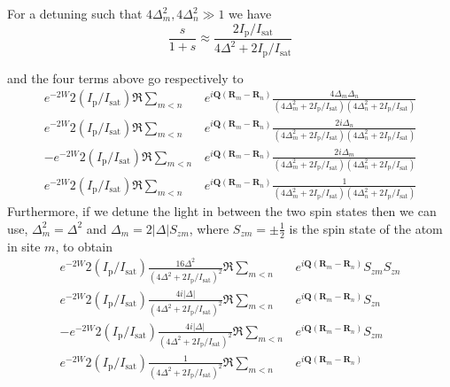 \documentclass[11pt,letter]{article}
\newcommand{\bv}[1]{\ensuremath{\bm{#1}}}
\newcommand{\iisat}{\ensuremath{I_{\mathrm{p}}/I_{\mathrm{sat}}}}
\begin{document}
For a detuning such that $4\Delta_{m}^{2}, 4\Delta_{n}^{2} \gg 1 $ we have
\begin{equation}
  \frac{s}{1+s} \approx \frac{2 \iisat }
                             { 4 \Delta^{2} + 2 \iisat }
\end{equation}

and the four terms above go respectively to  
\begin{align} 
     e^{-2W} 2(\iisat)\Re \sum_{m<n} & 
      e^{ i \bv{Q}( \bv{R}_{m} - \bv{R}_{n} ) } 
      \frac{ 4 \Delta_{m} \Delta_{n} } 
           {(4 \Delta_{m}^{2} + 2 \iisat)(4 \Delta_{n}^{2} + 2 \iisat)
 }  \\
     e^{-2W} 2(\iisat)\Re \sum_{m<n} & 
      e^{ i \bv{Q}( \bv{R}_{m} - \bv{R}_{n} ) } 
      \frac{ 2 i \Delta_{n} } 
           {(4 \Delta_{m}^{2} + 2 \iisat)(4 \Delta_{n}^{2} + 2 \iisat)
 }   \\
    -e^{-2W} 2(\iisat) \Re \sum_{m<n} & 
      e^{ i \bv{Q}( \bv{R}_{m} - \bv{R}_{n} ) } 
      \frac{ 2 i \Delta_{m} } 
           {(4 \Delta_{m}^{2} + 2 \iisat)(4 \Delta_{n}^{2} + 2 \iisat)
 }   \\
     e^{-2W} 2(\iisat)\Re \sum_{m<n} & 
      e^{ i \bv{Q}( \bv{R}_{m} - \bv{R}_{n} ) } 
      \frac{ 1} { (4 \Delta_{m}^{2} + 2 \iisat)(4 \Delta_{n}^{2} + 2 \iisat)
}   
\end{align}
Furthermore, if we detune the light in between the two spin states then we can
use, $\Delta_{m}^{2} = \Delta^{2}$ and  $\Delta_{m} = 2|\Delta|S_{zm}$, where
$S_{zm}=\pm\frac{1}{2}$ is the spin state of the atom in site $m$, to obtain
\begin{align} 
     e^{-2W} 2(\iisat)
      \frac{ 16 \Delta^{2}  } 
           {(4 \Delta^{2} + 2 \iisat)^{2} }  
       \Re \sum_{m<n} & 
      e^{ i \bv{Q}( \bv{R}_{m} - \bv{R}_{n} ) } 
      S_{zm}S_{zn}\\
     e^{-2W} 2(\iisat)
      \frac{ 4 i |\Delta| } 
           {(4 \Delta^{2} + 2 \iisat)^{2} }  
      \Re \sum_{m<n} & 
      e^{ i \bv{Q}( \bv{R}_{m} - \bv{R}_{n} ) } 
      S_{zn}  \\
    -e^{-2W} 2(\iisat) 
      \frac{ 4 i |\Delta|} 
           {(4 \Delta^{2} + 2 \iisat)^{2} }  
      \Re \sum_{m<n} & 
      e^{ i \bv{Q}( \bv{R}_{m} - \bv{R}_{n} ) } 
        S_{zm} \\
     e^{-2W} 2(\iisat)
      \frac{ 1} { (4 \Delta^{2} + 2 \iisat)^{2} }   
       \Re \sum_{m<n} & 
      e^{ i \bv{Q}( \bv{R}_{m} - \bv{R}_{n} ) } 
\end{align}
\end{document}
